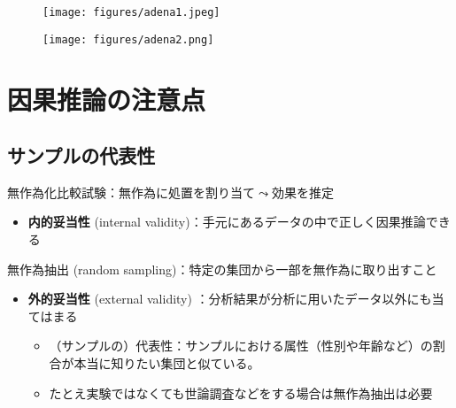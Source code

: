 \documentclass[
  xelatex,
  ja=standard]{bxjsarticle}
\providecommand{\tightlist}{%
  \setlength{\itemsep}{0pt}\setlength{\parskip}{0pt}}\usepackage{longtable,booktabs,array}
\begin{document}
\begin{figure}[htpb]

{\centering \texttt{[image: figures/adena1.jpeg]}

}

\caption{\citet{adena2015}}

\end{figure}

\begin{figure}[htpb]

{\centering \texttt{[image: figures/adena2.png]}

}

\caption{\citet{adena2015}}

\end{figure}

\hypertarget{ux56e0ux679cux63a8ux8ad6ux306eux6ce8ux610fux70b9}{%
\section{因果推論の注意点}\label{ux56e0ux679cux63a8ux8ad6ux306eux6ce8ux610fux70b9}}

\hypertarget{ux30b5ux30f3ux30d7ux30ebux306eux4ee3ux8868ux6027}{%
\subsection{サンプルの代表性}\label{ux30b5ux30f3ux30d7ux30ebux306eux4ee3ux8868ux6027}}

無作為化比較試験：無作為に処置を割り当て\(\leadsto\)効果を推定

\begin{itemize}
\tightlist
\item
  \textbf{内的妥当性} (internal
  validity)：手元にあるデータの中で正しく因果推論できる
\end{itemize}

無作為抽出 (random sampling)：特定の集団から一部を無作為に取り出すこと

\begin{itemize}
\tightlist
\item
  \textbf{外的妥当性} (external validity)
  ：分析結果が分析に用いたデータ以外にも当てはまる

  \begin{itemize}
  \tightlist
  \item
    （サンプルの）代表性：サンプルにおける属性（性別や年齢など）の割合が本当に知りたい集団と似ている。
  \item
    たとえ実験ではなくても世論調査などをする場合は無作為抽出は必要
  \end{itemize}
\end{itemize}
\end{document}
